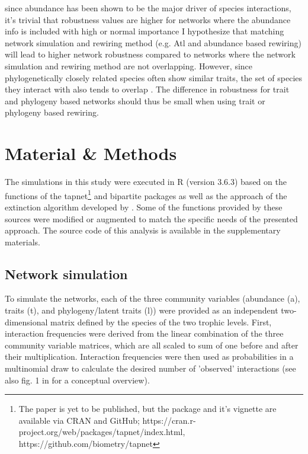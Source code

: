 \documentclass[12pt,a4paper]{article}
\begin{document}

since abundance has been shown to be the major driver of species interactions, it's trivial that robustness values are higher for networks where the abundance info is included with high or normal importance
I hypothesize that matching network simulation and rewiring method (e.g. Atl and abundance based rewiring) will lead to higher network robustness compared to networks where the network simulation and rewiring method are not overlapping. However, since phylogenetically closely related species often show similar traits, the set of species they interact with also tends to overlap \parencite{Gomez2010, Rezende2007}. The difference in robustness for trait and phylogeny based networks should thus be small when using trait or phylogeny based rewiring. 
\newpage

	\section{Material \& Methods}
	The simulations in this study were executed in R \parencite{Rcore} (version 3.6.3) based on the functions of the tapnet\footnote{The paper is yet to be published, but the package and it's vignette are available via CRAN and GitHub; https://cran.r-project.org/web/packages/tapnet/index.html, https://github.com/biometry/tapnet} \parencite{Benadi} and bipartite \parencite{Dormann2008} packages as well as the approach of the extinction algorithm developed by \citeauthor{Vizentin-Bugoni2019} \parencite{Vizentin-Bugoni2019}. Some of the functions provided by these sources were modified or augmented to match the specific needs of the presented approach. The source code of this analysis is available in the supplementary materials. \par



	\subsection{Network simulation} \label{sec:net_sim}
	To simulate the networks, each of the three community variables (abundance (a), traits (t), and phylogeny/latent traits (l)) were provided as an independent two-dimensional matrix defined by the species of the two trophic levels. First, interaction frequencies were derived from the linear combination of the three community variable matrices, which are all scaled to sum of one before and after their multiplication. Interaction frequencies were then used as probabilities in a multinomial draw to calculate the desired number of 'observed' interactions (see also fig. 1 in \cite{Benadi} for a conceptual overview). \par
\end{document}
